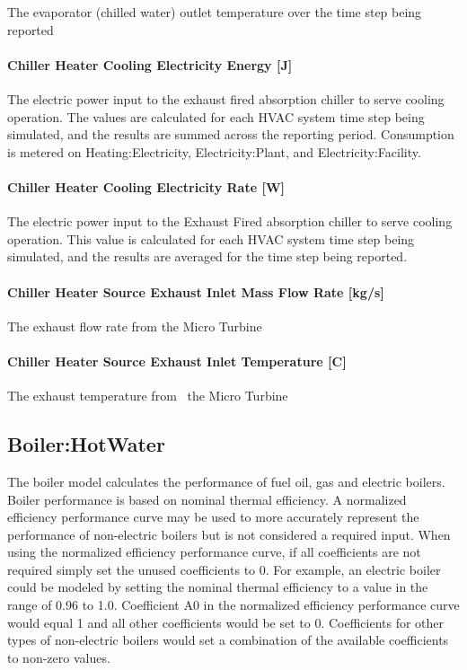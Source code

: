 The evaporator (chilled water) outlet temperature over the time step being reported

\paragraph{Chiller Heater Cooling Electricity Energy {[}J{]}}\label{chiller-heater-cooling-electric-energy-j-1}

The electric power input to the exhaust fired absorption chiller to serve cooling operation. The values are calculated for each HVAC system time step being simulated, and the results are summed across the reporting period. Consumption is metered on Heating:Electricity, Electricity:Plant, and Electricity:Facility.

\paragraph{Chiller Heater Cooling Electricity Rate {[}W{]}}\label{chiller-heater-cooling-electric-power-w-1}

The electric power input to the Exhaust Fired absorption chiller to serve cooling operation. This value is calculated for each HVAC system time step being simulated, and the results are averaged for the time step being reported.

\paragraph{Chiller Heater Source Exhaust Inlet Mass Flow Rate {[}kg/s{]}}\label{chiller-heater-source-exhaust-inlet-mass-flow-rate-kgs}

The exhaust flow rate from the Micro Turbine

\paragraph{Chiller Heater Source Exhaust Inlet Temperature {[}C{]}}\label{chiller-heater-source-exhaust-inlet-temperature-c}

The exhaust temperature from~ the Micro Turbine

\subsection{Boiler:HotWater}\label{boilerhotwater}

The boiler model calculates the performance of fuel oil, gas and electric boilers. Boiler performance is based on nominal thermal efficiency. A normalized efficiency performance curve may be used to more accurately represent the performance of non-electric boilers but is not considered a required input. When using the normalized efficiency performance curve, if all coefficients are not required simply set the unused coefficients to 0. For example, an electric boiler could be modeled by setting the nominal thermal efficiency to a value in the range of 0.96 to 1.0. Coefficient A0 in the normalized efficiency performance curve would equal 1 and all other coefficients would be set to 0. Coefficients for other types of non-electric boilers would set a combination of the available coefficients to non-zero values.

